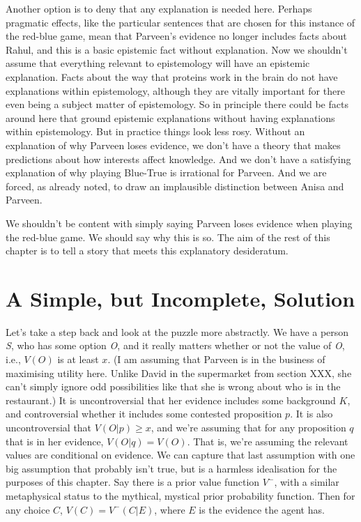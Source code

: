 \documentclass[11pt,]{book}
\begin{document}
Another option is to deny that any explanation is needed here. Perhaps pragmatic effects, like the particular sentences that are chosen for this instance of the red-blue game, mean that Parveen's evidence no longer includes facts about Rahul, and this is a basic epistemic fact without explanation. Now we shouldn't assume that everything relevant to epistemology will have an epistemic explanation. Facts about the way that proteins work in the brain do not have explanations within epistemology, although they are vitally important for there even being a subject matter of epistemology. So in principle there could be facts around here that ground epistemic explanations without having explanations within epistemology. But in practice things look less rosy. Without an explanation of why Parveen loses evidence, we don't have a theory that makes predictions about how interests affect knowledge. And we don't have a satisfying explanation of why playing Blue-True is irrational for Parveen. And we are forced, as already noted, to draw an implausible distinction between Anisa and Parveen.

We shouldn't be content with simply saying Parveen loses evidence when playing the red-blue game. We should say why this is so. The aim of the rest of this chapter is to tell a story that meets this explanatory desideratum.

\hypertarget{simplesolution}{%
\section{A Simple, but Incomplete, Solution}\label{simplesolution}}

Let's take a step back and look at the puzzle more abstractly. We have a person \emph{S}, who has some option \emph{O}, and it really matters whether or not the value of \emph{O}, i.e., \(V(O)\) is at least \(x\). (I am assuming that Parveen is in the business of maximising utility here. Unlike David in the supermarket from section XXX, she can't simply ignore odd possibilities like that she is wrong about who is in the restaurant.) It is uncontroversial that her evidence includes some background \(K\), and controversial whether it includes some contested proposition \(p\). It is also uncontroversial that \(V(O | p) \geq x\), and we're assuming that for any proposition \(q\) that is in her evidence, \(V(O | q) = V(O)\). That is, we're assuming the relevant values are conditional on evidence. We can capture that last assumption with one big assumption that probably isn't true, but is a harmless idealisation for the purposes of this chapter. Say there is a prior value function \(V^-\), with a similar metaphysical status to the mythical, mystical prior probability function. Then for any choice \(C\), \(V(C) = V^-(C | E)\), where \(E\) is the evidence the agent has.
\end{document}
